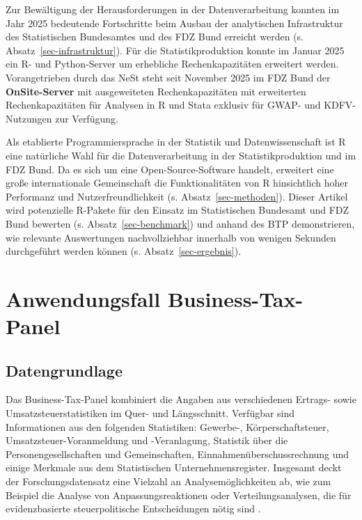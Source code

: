 \documentclass[
  german,
  10pt,
  twoside]{article}
\let\oldtextbf\textbf
\renewcommand{\textbf}[1]{{\color{wistaBlue}\oldtextbf{#1}}}
\let\oldref\ref
\renewcommand{\ref}[1]{\oldref{#1}\raisebox{-0.2ex}{\scriptsize\color{wistaBlue}\ding{247}}}
\begin{document}
Zur Bewältigung der Herausforderungen in der Datenverarbeitung konnten
im Jahr 2025 bedeutende Fortschritte beim Ausbau der analytischen
Infrastruktur des Statistischen Bundesamtes und des FDZ Bund erreicht
werden (s. Absatz~\ref{sec-infrastruktur}). Für die Statistikproduktion
konnte im Januar 2025 ein R- und Python-Server um erhebliche
Rechenkapazitäten erweitert werden. Vorangetrieben durch das NeSt steht
seit November 2025 im FDZ Bund der \textbf{OnSite-Server} mit
ausgeweiteten Rechenkapazitäten mit erweiterten Rechenkapazitäten für
Analysen in R und Stata exklusiv für GWAP- und KDFV-Nutzungen zur
Verfügung.

Als etablierte Programmiersprache in der Statistik und Datenwissenschaft
ist R eine natürliche Wahl für die Datenverarbeitung in der
Statistikproduktion und im FDZ Bund. Da es sich um eine
Open-Source-Software handelt, erweitert eine große internationale
Gemeinschaft die Funktionalitäten von R hinsichtlich hoher Performanz
und Nutzerfreundlichkeit (s. Absatz~\ref{sec-methoden}). Dieser Artikel
wird potenzielle R-Pakete für den Einsatz im Statistischen Bundesamt und
FDZ Bund bewerten (s. Absatz~\ref{sec-benchmark}) und anhand des BTP
demonstrieren, wie relevante Auswertungen nachvollziehbar innerhalb von
wenigen Sekunden durchgeführt werden können (s.
Absatz~\ref{sec-ergebnis}).

\section{Anwendungsfall Business-Tax-Panel}\label{sec-btp}

\subsection{Datengrundlage}\label{datengrundlage}

Das Business-Tax-Panel kombiniert die Angaben aus verschiedenen Ertrags-
sowie Umsatzsteuerstatistiken im Quer- und Längsschnitt. Verfügbar sind
Informationen aus den folgenden Statistiken: Gewerbe-,
Körperschaftsteuer, Umsatzsteuer-Voranmeldung und -Veranlagung,
Statistik über die Personengesellschaften und Gemeinschaften,
Einnahmenüberschussrechnung und einige Merkmale aus dem Statistischen
Unternehmensregister. Insgesamt deckt der Forschungsdatensatz eine
Vielzahl an Analysemöglichkeiten ab, wie zum Beispiel die Analyse von
Anpassungsreaktionen oder Verteilungsanalysen, die für evidenzbasierte
steuerpolitische Entscheidungen nötig sind
\autocite{kristiansen2023btp}.
\end{document}
